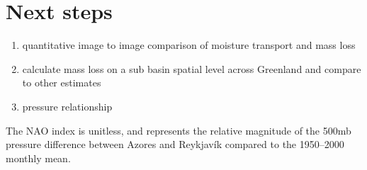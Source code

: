 \documentclass[11pt]{report}
\begin{document}
\begin{figure}[h]
\centering
{}
\caption[]{} \label{fig:Tslope}
\end{figure}







\section{Next steps}

\begin{enumerate}
\item quantitative image to image comparison of moisture transport and mass loss
\item calculate mass loss on a sub basin spatial level across Greenland and compare to other estimates
\item pressure relationship
\end{enumerate}

The NAO index is unitless, and represents the relative magnitude of the 500mb pressure difference between Azores and Reykjav\'ik compared to the 1950--2000 monthly mean.





\small
\renewcommand{\bibsep}{0em}

\renewcommand{\bibname}{References}


\end{document}
